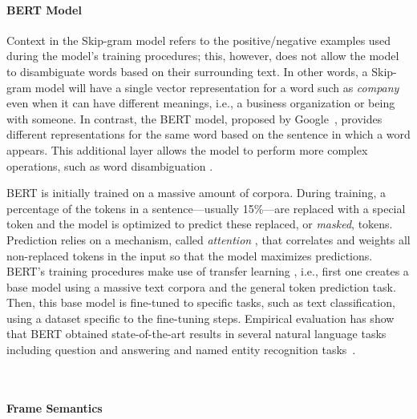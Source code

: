 



\paragraph{\textbf{BERT Model}}
\label{cp5:bert}

Context in the Skip-gram model refers to the positive/negative examples used during the model's training procedures; this, however, does not allow the model to disambiguate words based on their surrounding text. In other words, a Skip-gram model will have a single vector representation for a word such as \textit{company} even when it can have different meanings, i.e., a business organization or being with someone. In contrast, 
the \acf{BERT} model, proposed by Google~\cite{Devlin2018Bert}, provides different representations for the same word based on the sentence in which a word appears.
This additional layer allows the model to perform more complex operations, such as word disambiguation .


BERT is initially trained 
on a massive amount of corpora. During training, a percentage of the tokens in a sentence---usually 15\%---are replaced with a special token and the model is optimized to predict these replaced, or \textit{masked}, tokens. 
Prediction relies on a mechanism, called \textit{attention} , that correlates and weights all non-replaced tokens in the input so that the model maximizes predictions.
BERT's training procedures make use of transfer learning  , i.e., 
first one creates a base model using a massive text corpora and the general token prediction task. 
Then, this base model is fine-tuned to specific tasks, such as text classification, using a dataset specific to the fine-tuning steps. 
Empirical evaluation has show that BERT obtained state-of-the-art results in several natural language tasks including  question and answering and named entity recognition tasks~\cite{Devlin2018Bert}. 

~\cite{Lin2021}
~\cite{Araujo2021}




\paragraph{\textbf{Frame Semantics}}
\label{cp5:frame-semantics}


